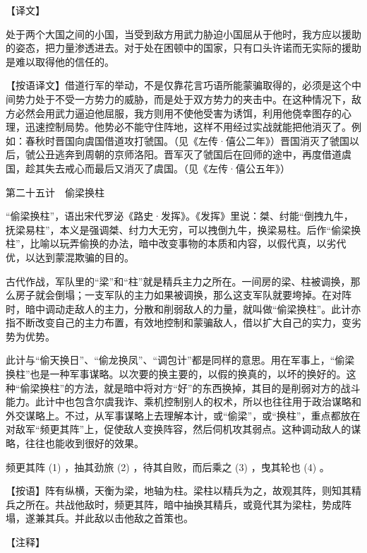 \documentclass[12pt,UTF8]{ctexbook}
\begin{document}
【译文】


处于两个大国之间的小国，当受到敌方用武力胁迫小国屈从于他时，我方应以援助的姿态，把力量渗透进去。对于处在困顿中的国家，只有口头许诺而无实际的援助是难以取得他的信任的。

【按语译文】借道行军的举动，不是仅靠花言巧语所能蒙骗取得的，必须是这个中间势力处于不受一方势力的威胁，而是处于双方势力的夹击中。在这种情况下，敌方必然会用武力逼迫他屈服，我方则用不使他受害为诱饵，利用他侥幸图存的心理，迅速控制局势。他势必不能守住阵地，这样不用经过实战就能把他消灭了。例如：春秋时晋国向虞国借道攻打虢国。（见《左传·僖公二年》）晋国消灭了虢国以后，虢公丑逃奔到周朝的京师洛阳。晋军灭了虢国后在回师的途中，再度借道虞国，趁其失去戒心而最后又消灭了虞国。（见《左传·僖公五年》）





第二十五计　偷梁换柱


“偷梁换柱”，语出宋代罗泌《路史·发挥》。《发挥》里说：桀、纣能“倒拽九牛，抚梁易柱”，本义是强调桀、纣力大无穷，可以拽倒九牛，换梁易柱。后作“偷梁换柱”，比喻以玩弄偷换的办法，暗中改变事物的本质和内容，以假代真，以劣代优，以达到蒙混欺骗的目的。

古代作战，军队里的“梁”和“柱”就是精兵主力之所在。一间房的梁、柱被调换，那么房子就会倒塌；一支军队的主力如果被调换，那么这支军队就要垮掉。在对阵时，暗中调动走敌人的主力，分散和削弱敌人的力量，就叫做“偷梁换柱”。此计亦指不断改变自己的主力布置，有效地控制和蒙骗敌人，借以扩大自己的实力，变劣势为优势。

此计与“偷天换日”、“偷龙换凤”、“调包计”都是同样的意思。用在军事上，“偷梁换柱”也是一种军事谋略。以次要的换主要的，以假的换真的，以坏的换好的。这种“偷梁换柱”的方法，就是暗中将对方“好”的东西换掉，其目的是削弱对方的战斗能力。此计中也包含尔虞我诈、乘机控制别人的权术，所以也往往用于政治谋略和外交谋略上。不过，从军事谋略上去理解本计，或“偷梁”，或“换柱”，重点都放在对敌军“频更其阵”上，促使敌人变换阵容，然后伺机攻其弱点。这种调动敌人的谋略，往往也能收到很好的效果。





频更其阵 (1) ，抽其劲旅 (2) ，待其自败，而后乘之 (3) ，曳其轮也 (4) 。

【按语】阵有纵横，天衡为梁，地轴为柱。梁柱以精兵为之，故观其阵，则知其精兵之所在。共战他敌时，频更其阵，暗中抽换其精兵，或竟代其为梁柱，势成阵塌，遂兼其兵。并此敌以击他敌之首策也。





【注释】
\end{document}
